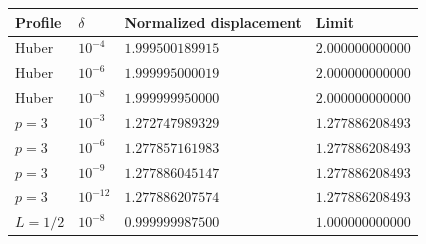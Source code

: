 \begin{center}
\begin{tabular}{@{}llll@{}}
\toprule
Profile & \(\delta\) & Normalized displacement & Limit\\
\midrule
Huber & \(10^{-4}\) & \(1.999500189915\) & \(2.000000000000\)\\
Huber & \(10^{-6}\) & \(1.999995000019\) & \(2.000000000000\)\\
Huber & \(10^{-8}\) & \(1.999999950000\) & \(2.000000000000\)\\
\(p=3\) & \(10^{-3}\) & \(1.272747989329\) & \(1.277886208493\)\\
\(p=3\) & \(10^{-6}\) & \(1.277857161983\) & \(1.277886208493\)\\
\(p=3\) & \(10^{-9}\) & \(1.277886045147\) & \(1.277886208493\)\\
\(p=3\) & \(10^{-12}\) & \(1.277886207574\) & \(1.277886208493\)\\
\(L=1/2\) & \(10^{-8}\) & \(0.999999987500\) & \(1.000000000000\)\\
\bottomrule
\end{tabular}
\end{center}
